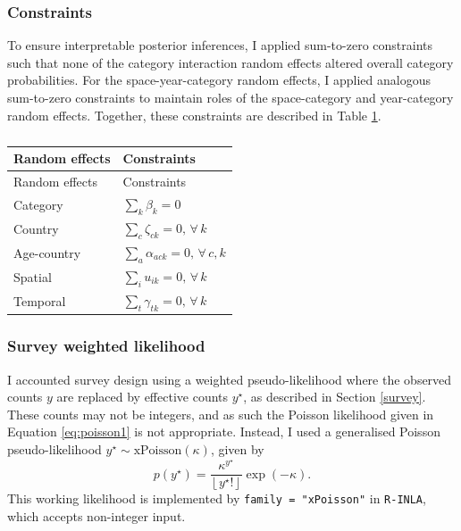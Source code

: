 \documentclass[a4paper, nobind]{templates/ociamthesis}
\begin{document}
\hypertarget{constraints}{%
\subsubsection{Constraints}\label{constraints}}

To ensure interpretable posterior inferences, I applied sum-to-zero constraints such that none of the category interaction random effects altered overall category probabilities.
For the space-year-category random effects, I applied analogous sum-to-zero constraints to maintain roles of the space-category and year-category random effects.
Together, these constraints are described in Table \ref{tab:constraints}.

\begin{longtable}[]{@{}ll@{}}
\caption{\label{tab:constraints}}\tabularnewline
\toprule\noalign{}
Random effects & Constraints \\
\midrule\noalign{}
\endfirsthead
\toprule\noalign{}
Random effects & Constraints \\
\midrule\noalign{}
\endhead
\bottomrule\noalign{}
\endlastfoot
Category & \(\sum_k \beta_k = 0\) \\
Country & \(\sum_c \zeta_{ck} = 0, \, \forall \, k\) \\
Age-country & \(\sum_a \alpha_{ack} = 0, \, \forall \, c, k\) \\
Spatial & \(\sum_i u_{ik} = 0, \, \forall \, k\) \\
Temporal & \(\sum_t \gamma_{tk} = 0, \, \forall \, k\) \\
\end{longtable}

\hypertarget{survey-weighted-likelihood}{%
\subsubsection{Survey weighted likelihood}\label{survey-weighted-likelihood}}

I accounted survey design using a weighted pseudo-likelihood where the observed counts \(y\) are replaced by effective counts \(y^\star\), as described in Section \ref{survey}.
These counts may not be integers, and as such the Poisson likelihood given in Equation \eqref{eq:poisson1} is not appropriate.
Instead, I used a generalised Poisson pseudo-likelihood \(y^\star \sim \text{xPoisson}(\kappa)\), given by
\begin{equation}
    p(y^\star) = \frac{\kappa^{y^\star}}{\left \lfloor{y^\star!}\right \rfloor } \exp \left(- \kappa \right).
\end{equation}
This working likelihood is implemented by \texttt{family\ =\ "xPoisson"} in \texttt{R-INLA}, which accepts non-integer input.
\end{document}
